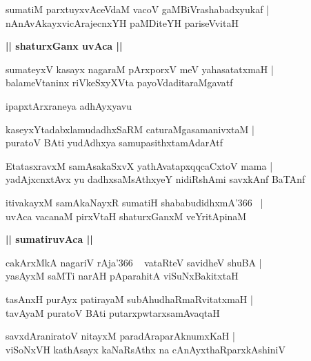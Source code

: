 \documentclass[twoside,12pt,openright]{book}
\newcounter{shloka}[chapter]
\def\uvaca#1{\centerline{{\large\textbf{#1}}}}
\begin{document}
\begin{shloka}%
sumatiM parxtuyxvAceVdaM vacoV gaMBiVrashabadxyukaf |\\
nAnAvAkayxvicArajecnxYH paMDiteYH pariseVvitaH
\end{shloka}

\uvaca{|| shaturxGanx uvAca ||}

\begin{shloka}%
sumateyxV kasayx nagaraM pArxporxV meV yahasatatxmaH |\\
balameVtaninx riVkeSxyXVta payoVdaditaraMgavatf 
\end{shloka}

\begin{center}
ipapxtArxraneya adhAyxyavu
\end{center}

\begin{shloka}%
kaseyxYtadabxlamudadhxSaRM caturaMgasamanivxtaM |\\
puratoV BAti yudAdhxya samupasithxtamAdarAtf 
\end{shloka}

\begin{shloka}%
EtatasxravxM samAsakaSxvX yathAvatapxqqcaCxtoV mama |\\
yadAjxcnxtAvx yu dadhxsaMsAthxyeY nidiRshAmi savxkAnf BaTAnf
\end{shloka}

\begin{shloka}%
itivakayxM samAkaNayxR sumatiH shababudidhxmA\char'366 ~|\\
uvAca vacanaM pirxVtaH shaturxGanxM veYritApinaM 
\end{shloka}

\uvaca{|| sumatiruvAca ||}

\begin{shloka}%
cakArxMkA nagariV rAja\char'366 ~ vataRteV savidheV shuBA |\\
yasAyxM saMTi narAH pAparahitA viSuNxBakitxtaH 
\end{shloka}

\begin{shloka}%
tasAnxH purAyx patirayaM subAhudhaRmaRvitatxmaH |\\
tavAyaM puratoV BAti putarxpwtarxsamAvaqtaH 
\end{shloka}

\begin{shloka}%
savxdAraniratoV nitayxM paradAraparAknumxKaH |\\
viSoNxVH kathAsayx kaNaRsAthx na cAnAyxthaRparxkAshiniV 
\end{shloka}
\end{document}

